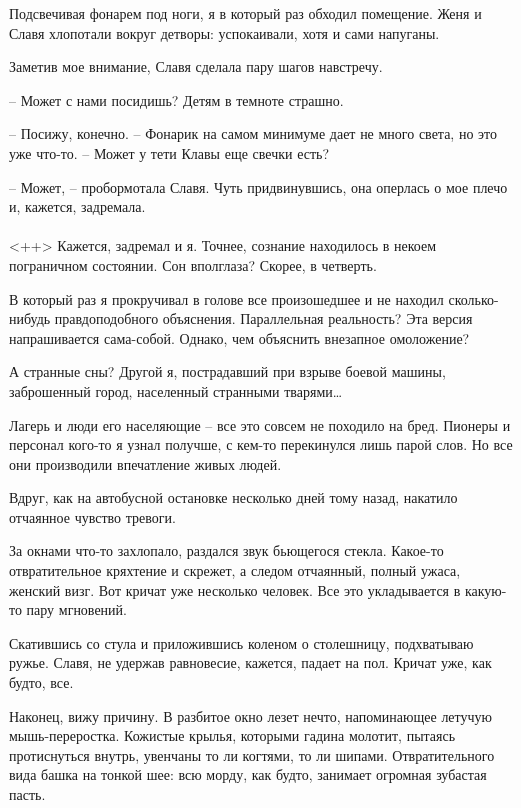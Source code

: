 \documentclass[a4paper]{book}
\begin{document}
Подсвечивая фонарем под ноги, я в который раз обходил помещение. Женя и Славя хлопотали вокруг детворы: успокаивали, хотя и сами напуганы.

Заметив мое внимание, Славя сделала пару шагов навстречу.

-- Может с нами посидишь? Детям в темноте страшно. 

-- Посижу, конечно. -- Фонарик на самом минимуме дает не много света, но это уже что-то. -- Может у тети Клавы еще свечки есть?

-- Может, -- пробормотала Славя. Чуть придвинувшись, она оперлась о мое плечо и, кажется, задремала. 

\paragraph{}<++>
Кажется, задремал и я. Точнее, сознание находилось в некоем пограничном состоянии. Сон вполглаза? Скорее, в четверть. 

В который раз я прокручивал в голове все произошедшее и не находил сколько-нибудь правдоподобного объяснения. Параллельная реальность? Эта версия напрашивается сама-собой. Однако, чем объяснить внезапное омоложение?

А странные сны? Другой я, пострадавший при взрыве боевой машины, заброшенный город, населенный странными тварями\ldots

Лагерь и люди его населяющие -- все это совсем не походило на бред. Пионеры и персонал кого-то я узнал получше, с кем-то перекинулся лишь парой слов. Но все они производили впечатление живых людей.

Вдруг, как на автобусной остановке несколько дней тому назад, накатило отчаянное чувство тревоги. 

За окнами что-то захлопало, раздался звук бьющегося стекла. Какое-то отвратительное кряхтение и скрежет, а следом отчаянный, полный ужаса, женский визг. Вот кричат уже несколько человек. Все это укладывается в какую-то пару мгновений.

Скатившись со стула и приложившись коленом о столешницу, подхватываю ружье. Славя, не удержав равновесие, кажется, падает на пол. Кричат уже, как будто, все. 

Наконец, вижу причину. В разбитое окно лезет нечто, напоминающее летучую мышь-переростка. Кожистые крылья, которыми гадина молотит, пытаясь протиснуться внутрь, увенчаны то ли когтями, то ли шипами. Отвратительного вида башка на тонкой шее: всю морду, как будто, занимает огромная зубастая пасть. 
\end{document}
